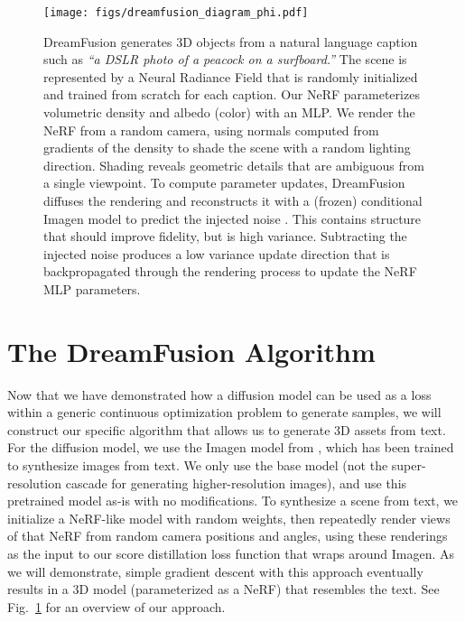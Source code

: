 \documentclass{article} \usepackage{iclr2023_conference,times}
\newcommand{\dreamfusion}{DreamFusion\xspace}
\begin{document}
\begin{figure}[t]
\centering
\texttt{[image: figs/dreamfusion\_diagram\_phi.pdf]}
  \caption{\dreamfusion generates 3D objects from a natural language caption such as {\footnotesize\em ``a DSLR photo of a peacock on a surfboard.''}
The scene is represented by a Neural Radiance Field that is randomly initialized and trained from scratch for each caption. Our NeRF parameterizes volumetric density and albedo (color) with an MLP. We render the NeRF from a random camera, using normals computed from gradients of the density to shade the scene with a random lighting direction.
Shading reveals geometric details that are ambiguous from a single viewpoint. To compute parameter updates, \dreamfusion diffuses the rendering and reconstructs it with a (frozen) conditional Imagen model to predict the injected noise .
  This contains structure that should improve fidelity, but is high variance. Subtracting the injected noise produces a low variance update direction  that is backpropagated through the rendering process to update the NeRF MLP parameters.}
\label{fig:diagram}
\end{figure}



\section{The \dreamfusion Algorithm}

Now that we have demonstrated how a diffusion model can be used as a loss within a generic continuous optimization problem to generate samples, we will construct our specific algorithm that allows us to generate 3D assets from text. For the diffusion model, we use the Imagen  model from \citet{imagen}, which has been trained to synthesize images from text. We only use the  base model (not the super-resolution cascade for generating higher-resolution images), and use this pretrained model as-is with no modifications. To synthesize a scene from text, we initialize a NeRF-like model with random weights, then repeatedly render views of that NeRF from random camera positions and angles, using these renderings as the input to our score distillation loss function that wraps around Imagen. As we will demonstrate, simple gradient descent with this approach eventually results in a 3D model (parameterized as a NeRF) that resembles the text. See Fig.~\ref{fig:diagram} for an overview of our approach.
\end{document}
